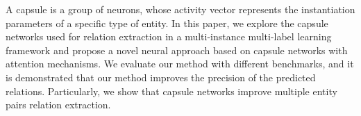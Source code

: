 A capsule is a group of neurons, whose activity vector represents the instantiation parameters of a specific type of entity. In this paper, we explore the capsule networks used for relation extraction in a multi-instance multi-label learning framework and propose a novel neural approach based on   capsule networks with attention mechanisms. We evaluate our method with different benchmarks, and it is demonstrated that our method improves the precision of the predicted relations. Particularly, we show that capsule networks improve multiple entity pairs relation extraction.
